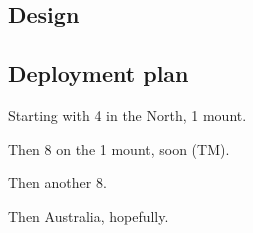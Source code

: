\begin{colsection}

\subsection{Design}
\label{sec:goto_design}
\begin{colsection}


\end{colsection}


\subsection{Deployment plan}
\label{sec:goto_expansion}
\begin{colsection}

Starting with 4 in the North, 1 mount.

Then 8 on the 1 mount, soon (TM).

Then another 8.

Then Australia, hopefully.

\end{colsection}


\end{colsection}

